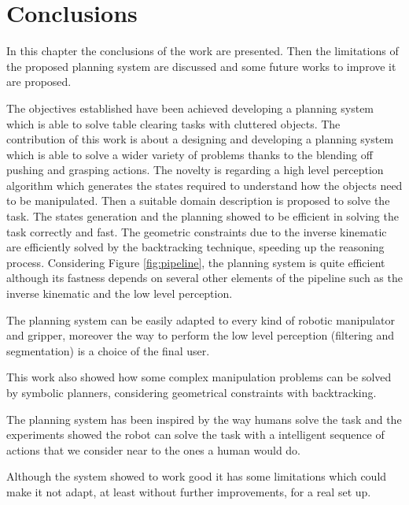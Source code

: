 \chapter{Conclusions}
\label{ch:conclusions}

In this chapter the conclusions of the work are presented. Then the limitations of the proposed planning system are discussed and some future works to improve it are proposed. 

The objectives established have been achieved developing a planning system which is able to solve table clearing tasks with cluttered objects. The contribution of this work is about a designing and developing a planning system which is able to solve a wider variety of problems thanks to the blending off pushing and grasping actions.
The novelty is regarding a high level perception algorithm which generates the states required to understand how the objects need to be manipulated. Then a suitable domain description is proposed to solve the task. The states generation and the planning showed to be efficient in solving the task correctly and fast. 
The geometric constraints due to the inverse kinematic are efficiently solved by the backtracking technique, speeding up the reasoning process. Considering Figure \ref{fig:pipeline}, the planning system is quite efficient although its fastness depends on several other elements of the pipeline such as the inverse kinematic and the low level perception.  

The planning system can be easily adapted to every kind of robotic manipulator and gripper, moreover the way to perform the low level perception (filtering and segmentation) is a choice of the final user.

This work also showed how some complex manipulation problems can be solved by symbolic planners, considering geometrical constraints with backtracking. 

The planning system has been inspired by the way humans solve the task and the experiments showed the robot can solve the task with a intelligent sequence of actions that we consider near to the ones a human would do.  

Although the system showed to work good it has some limitations which could make it not adapt, at least without further improvements, for a real set up. 

